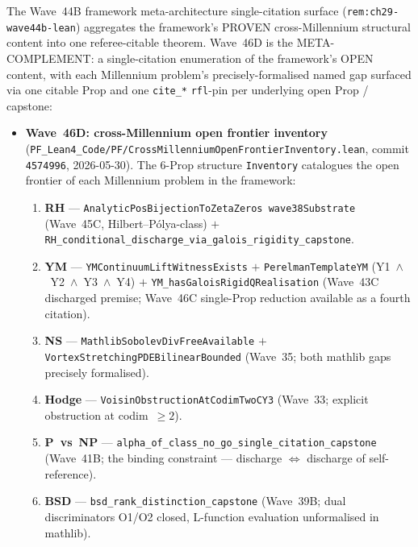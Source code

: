 \begin{remark}\label{rem:ch29-wave46d-lean}
The Wave~44B framework meta-architecture single-citation surface (\texttt{rem:ch29-wave44b-lean}) aggregates the framework's PROVEN cross-Millennium structural content into one referee-citable theorem. Wave~46D is the META-COMPLEMENT: a single-citation enumeration of the framework's OPEN content, with each Millennium problem's precisely-formalised named gap surfaced via one citable Prop and one \texttt{cite\_*} \texttt{rfl}-pin per underlying open Prop / capstone:
\begin{itemize}
  \item \textbf{Wave~46D: cross-Millennium open frontier inventory} (\texttt{PF\_Lean4\_Code/PF/CrossMillenniumOpenFrontierInventory.lean}, commit \texttt{4574996}, 2026-05-30). The 6-Prop structure \texttt{Inventory} catalogues the open frontier of each Millennium problem in the framework:
  \begin{enumerate}
    \item \textbf{RH} --- \texttt{AnalyticPosBijectionToZetaZeros wave38Substrate} (Wave~45C, Hilbert--P\'olya-class) $+$ \texttt{RH\_conditional\_discharge\_via\_galois\_rigidity\_capstone}.
    \item \textbf{YM} --- \texttt{YMContinuumLiftWitnessExists} $+$ \texttt{PerelmanTemplateYM} (Y1~$\wedge$~Y2~$\wedge$~Y3~$\wedge$~Y4) $+$ \texttt{YM\_hasGaloisRigidQRealisation} (Wave~43C discharged premise; Wave~46C single-Prop reduction available as a fourth citation).
    \item \textbf{NS} --- \texttt{MathlibSobolevDivFreeAvailable} $+$ \texttt{VortexStretchingPDEBilinearBounded} (Wave~35; both mathlib gaps precisely formalised).
    \item \textbf{Hodge} --- \texttt{VoisinObstructionAtCodimTwoCY3} (Wave~33; explicit obstruction at codim~$\geq 2$).
    \item \textbf{P~vs~NP} --- \texttt{alpha\_of\_class\_no\_go\_single\_citation\_capstone} (Wave~41B; the binding constraint --- discharge $\Leftrightarrow$ discharge of self-reference).
    \item \textbf{BSD} --- \texttt{bsd\_rank\_distinction\_capstone} (Wave~39B; dual discriminators O1/O2 closed, L-function evaluation unformalised in mathlib).
  \end{enumerate}

\end{itemize}
\end{remark}

